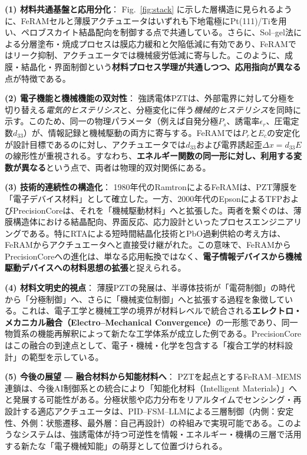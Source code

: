 \documentclass[conference]{IEEEtran}
\begin{document}
\medskip
\noindent
\textbf{(1) 材料共通基盤と応用分化}：
Fig.~\ref{fig:stack} に示した層構造に見られるように、FeRAMセルと薄膜アクチュエータはいずれも下地電極にPt(111)/Tiを用い、ペロブスカイト結晶配向を制御する点で共通している。さらに、Sol--gel法による分層塗布・焼成プロセスは膜応力緩和と欠陥低減に有効であり、FeRAMではリーク抑制、アクチュエータでは機械疲労低減に寄与した。このように、成膜・結晶化・界面制御という\textbf{材料プロセス学理が共通しつつ、応用指向が異なる}点が特徴である。

\medskip
\noindent
\textbf{(2) 電子機能と機械機能の双対性}：
強誘電体PZTは、外部電界に対して分極を切り替える\textit{電気的ヒステリシス}と、分極変化に伴う\textit{機械的ヒステリシス}を同時に示す。このため、同一の物理パラメータ（例えば自発分極$P_s$、誘電率$\epsilon_r$、圧電定数$d_{33}$）が、情報記録と機械駆動の両方に寄与する。FeRAMでは$P_r$と$E_c$の安定化が設計目標であるのに対し、アクチュエータでは$d_{33}$および電界誘起歪$\Delta x = d_{33} E$の線形性が重視される。すなわち、\textbf{エネルギー関数の同一形に対し、利用する変数が異なる}という点で、両者は物理的双対関係にある。

\medskip
\noindent
\textbf{(3) 技術的連続性の構造化}：
1980年代のRamtronによるFeRAMは、PZT薄膜を「電子デバイス材料」として確立した。一方、2000年代のEpsonによるTFPおよびPrecisionCoreは、それを「機械駆動材料」へと拡張した。両者を繋ぐのは、薄膜構造体における結晶配向、界面反応、応力設計といったプロセスエンジニアリングである。特にRTAによる短時間結晶化技術とPbO過剰供給の考え方は、FeRAMからアクチュエータへと直接受け継がれた。この意味で、FeRAMからPrecisionCoreへの進化は、単なる応用転換ではなく、\textbf{電子情報デバイスから機械駆動デバイスへの材料思想の拡張}と捉えられる。

\medskip
\noindent
\textbf{(4) 材料文明史的視点}：
薄膜PZTの発展は、半導体技術が「電荷制御」の時代から「分極制御」へ、さらに「機械変位制御」へと拡張する過程を象徴している。これは、電子工学と機械工学の境界が材料レベルで統合される\textbf{エレクトロ・メカニカル融合（Electro–Mechanical Convergence）}の一形態であり、同一物質系の機能再解釈によって新たな工学体系が成立した例である。PrecisionCoreはこの融合の到達点として、電子・機械・化学を包含する「複合工学的材料設計」の範型を示している。

\medskip
\noindent
\textbf{(5) 今後の展望 ― 融合材料から知能材料へ}：
PZTを起点とするFeRAM--MEMS連鎖は、今後AI制御系との統合により「知能化材料（Intelligent Materials）」へと発展する可能性がある。分極状態や応力分布をリアルタイムでセンシング・再設計する適応アクチュエータは、PID--FSM--LLMによる三層制御（内側：安定性、外側：状態遷移、最外層：自己再設計）の枠組みで実現可能である。このようなシステムは、強誘電体が持つ可逆性を情報・エネルギー・機構の三層で活用する新たな「電子機械知能」の萌芽として位置づけられる。
\end{document}
